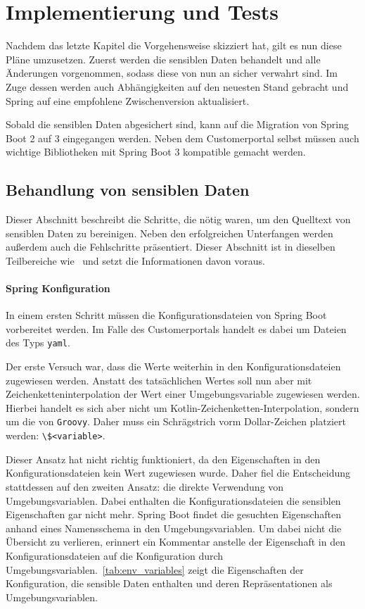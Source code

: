 \chapter{Implementierung und Tests}
\label{cha:implementation}

Nachdem das letzte Kapitel die Vorgehensweise skizziert hat, gilt es nun diese Pläne umzusetzen. Zuerst werden die sensiblen Daten behandelt und alle Änderungen vorgenommen, sodass diese von nun an sicher verwahrt sind. Im Zuge dessen werden auch Abhängigkeiten auf den neuesten Stand gebracht und Spring auf eine empfohlene Zwischenversion aktualisiert.

Sobald die sensiblen Daten abgesichert sind, kann auf die Migration von Spring Boot 2 auf 3 eingegangen werden. Neben dem Customerportal selbst müssen auch wichtige Bibliotheken mit Spring Boot 3 kompatible gemacht werden.

\section{Behandlung von sensiblen Daten}

Dieser Abschnitt beschreibt die Schritte, die nötig waren, um den Quelltext von sensiblen Daten zu bereinigen. Neben den erfolgreichen Unterfangen werden außerdem auch die Fehlschritte präsentiert. Dieser Abschnitt ist in dieselben Teilbereiche wie~ und setzt die Informationen davon voraus.

\subsubsection{Spring Konfiguration}

In einem ersten Schritt müssen die Konfigurationsdateien von Spring Boot vorbereitet werden. Im Falle des Customerportals handelt es dabei um Dateien des Typs \texttt{yaml}.

Der erste Versuch war, dass die Werte weiterhin in den Konfigurationsdateien zugewiesen werden. Anstatt des tatsächlichen Wertes soll nun aber mit Zeichenketteninterpolation der Wert einer Umgebungsvariable zugewiesen werden. Hierbei handelt es sich aber nicht um Kotlin-Zeichenketten-Interpolation, sondern um die von \texttt{Groovy}. Daher muss ein Schrägstrich vorm Dollar-Zeichen platziert werden: \texttt{\textbackslash\${<variable>}}.

Dieser Ansatz hat nicht richtig funktioniert, da den Eigenschaften in den Konfigurationsdateien kein Wert zugewiesen wurde. Daher fiel die Entscheidung stattdessen auf den zweiten Ansatz: die direkte Verwendung von Umgebungsvariablen. Dabei enthalten die Konfigurationsdateien die sensiblen Eigenschaften gar nicht mehr. Spring Boot findet die gesuchten Eigenschaften anhand eines Namensschema in den Umgebungsvariablen. Um dabei nicht die Übersicht zu verlieren, erinnert ein Kommentar anstelle der Eigenschaft in den Konfigurationsdateien auf die Konfiguration durch Umgebungsvariablen.~\autoref{tab:env_variables} zeigt die Eigenschaften der Konfiguration, die sensible Daten enthalten und deren Repräsentationen als Umgebungsvariablen.

